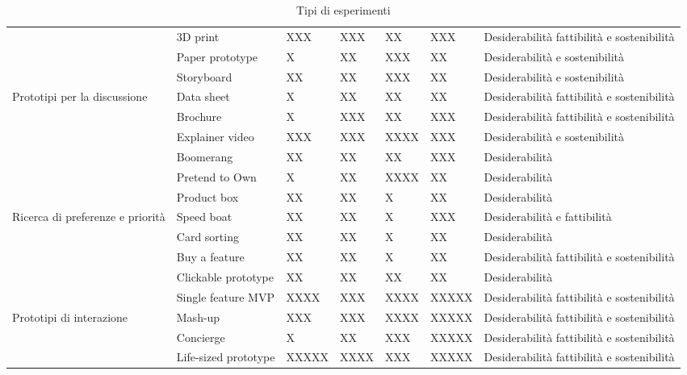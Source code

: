 \begin{table}[ht]
\begin{tabular}{|p{2cm}|p{2cm}|p{2cm}|p{2cm}|p{2cm}|p{2cm}|p{2cm}|}
& 3D print & XXX & XXX & XX & XXX & Desiderabilità fattibilità e sostenibilità\\
& Paper prototype & X & XX & XXX & XX & Desiderabilità e sostenibilità\\
& Storyboard & XX & XX & XXX & XX & Desiderabilità e sostenibilità\\
Prototipi per la discussione & Data sheet & X & XX & XX & XX & Desiderabilità fattibilità e sostenibilità\\
& Brochure & X & XXX & XX & XXX & Desiderabilità fattibilità e sostenibilità\\
& Explainer video & XXX & XXX & XXXX & XXX & Desiderabilità e sostenibilità\\
& Boomerang & XX & XX & XX & XXX & Desiderabilità\\
& Pretend to Own & X & XX & XXXX & XX & Desiderabilità\\\hline

& Product box & XX & XX & X & XX & Desiderabilità\\
Ricerca di preferenze e priorità & Speed boat & XX & XX & X & XXX & Desiderabilità e fattibilità\\
& Card sorting & XX & XX & X & XX & Desiderabilità\\
& Buy a feature & XX & XX & X & XX & Desiderabilità fattibilità e sostenibilità\\\hline

& Clickable prototype & XX & XX & XX & XX & Desiderabilità\\
& Single feature MVP & XXXX & XXX & XXXX & XXXXX & Desiderabilità fattibilità e sostenibilità\\
Prototipi di interazione & Mash-up & XXX & XXX & XXXX & XXXXX & Desiderabilità fattibilità e sostenibilità\\
& Concierge & X & XX & XXX & XXXXX & Desiderabilità fattibilità e sostenibilità\\
& Life-sized prototype & XXXXX & XXXX & XXX & XXXXX & Desiderabilità fattibilità e sostenibilità\\\hline
\end{tabular}
\caption{Tipi di esperimenti}
\end{table}

